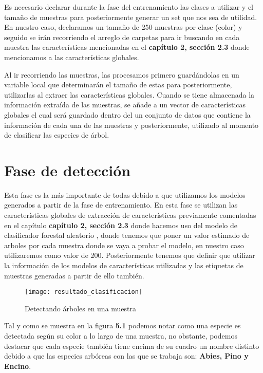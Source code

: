 Es necesario declarar durante la fase del entrenamiento las clases a utilizar y el tamaño de muestras para posteriormente generar un set que nos sea de utilidad. En nuestro caso, declaramos un tamaño de 250 muestras por clase (color) y seguido se irán recorriendo el arreglo de carpetas para ir buscando en cada muestra las características mencionadas en el \textbf{capítulo 2, sección 2.3} donde mencionamos a las características globales.

Al ir recorriendo las muestras, las procesamos primero guardándolas en un variable local que determinarán el tamaño de estas para posteriormente, utilizarlas al extraer las características globales. Cuando se tiene almacenada la información extraída de las muestras, se añade a un vector de características globales el cual será guardado dentro del un conjunto de datos que contiene la información de cada una de las muestras y posteriormente, utilizado al momento de clasificar las especies de árbol. 

\section{Fase de detección}
Esta fase es la más importante de todas debido a que utilizamos los modelos generados a partir de la fase de entrenamiento. En esta fase se utilizan las características globales de extracción de características previamente comentadas en el capítulo \textbf{capítulo 2, sección 2.3} donde hacemos uso del modelo de clasificador forestal aleatorio , donde tenemos que poner un valor estimado de arboles por cada muestra donde se vaya a probar el modelo, en nuestro caso utilizaremos como valor de 200. Posteriormente tenemos que definir que utilizar la información de los modelos de características utilizadas y las etiquetas de muestras generadas a partir de ello también. 
\\

\begin{figure}[H]
  \centering
  \begin{minipage}[b]{0.8\textwidth}
        \texttt{[image: resultado\_clasificacion]}
    \caption{Detectando árboles en una muestra}
  \end{minipage}
\end{figure}

Tal y como se muestra en la figura \textbf{5.1}  podemos notar como una especie es detectada según su color a lo largo de una muestra, no obstante, podemos destacar que cada especie también tiene encima de su cuadro un nombre distinto debido a que las especies arbóreas con las que se trabaja son: \textbf{Abies, Pino y Encino}. 

